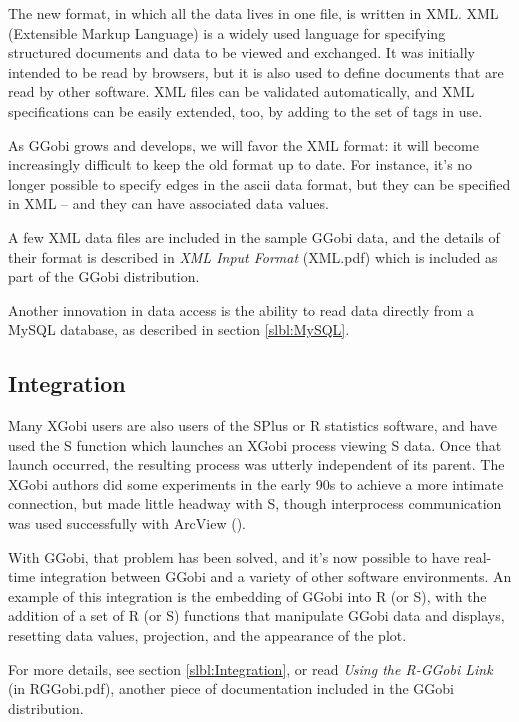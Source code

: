 \documentclass[11pt]{article}
\begin{document}
The new format, in which all the data lives in one file, is written
in XML.  XML (Extensible Markup Language) is a widely used language
for specifying structured documents and data to be viewed and
exchanged.  It was initially intended to be read by browsers, but it
is also used to define documents that are read by other software.
XML files can be validated automatically, and XML specifications can
be easily extended, too, by adding to the set of tags in use.

As GGobi grows and develops, we will favor the XML format:  it
will become increasingly difficult to keep the old format up to
date.  For instance, it's no longer possible to specify edges
in the ascii data format, but they can be specified in XML -- and
they can have associated data values.

A few XML data files are included in the sample GGobi data, and
the details of their format is described in {\em XML Input Format}
(XML.pdf) which is included as part of the GGobi distribution.

Another innovation in data access is the ability to read data
directly from a MySQL database, as described in section \ref{slbl:MySQL}.

\subsection{Integration}

Many XGobi users are also users of the SPlus or R statistics software, and
have used the S function which launches an XGobi process viewing S data.
Once that launch occurred, the resulting process was utterly independent
of its parent.  The XGobi authors did some experiments in the early 90s
to achieve a more intimate connection, but made little headway with S,
though interprocess communication was used successfully with ArcView
(\cite{SwayneBujaHubbell91,SMCM97}).

With GGobi, that problem has been solved, and it's now possible
to have real-time integration between GGobi and a variety of
other software environments.  An example of this integration is
the embedding of GGobi into R (or S), with the addition of a set of
R (or S) functions that manipulate GGobi data and displays,
resetting data values, projection, and the appearance of the plot.

For more details, see section \ref{slbl:Integration}, or read
{\em Using the R-GGobi Link} (in RGGobi.pdf), another piece of
documentation included in the GGobi distribution.
\end{document}
